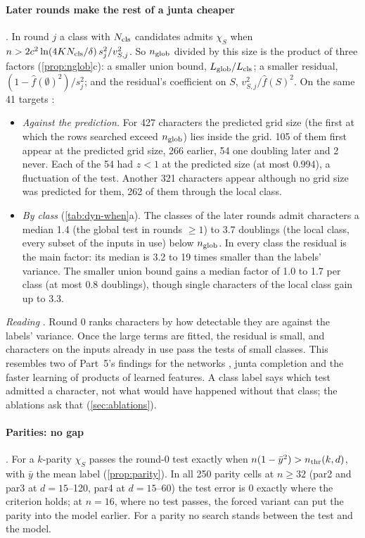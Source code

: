 \paragraph{Later rounds make the rest of a junta cheaper} . In round $j$ a class with $N_{\rm cls}$ candidates admits $\chi_S$ when $n>2c^2\ln(4KN_{\rm cls}/\delta)\,s_j^2/v_{S,j}^2$. So $n_{\rm glob}$ divided by this size is the product of three factors (\cref{prop:nglob}c): a smaller union bound, $L_{\rm glob}/L_{\rm cls}$; a smaller residual, $(1-\hat f(\emptyset)^2)/s_j^2$; and the residual's coefficient on $S$, $v_{S,j}^2/\hat f(S)^2$. On the same 41 targets :
\begin{itemize}
\item \emph{Against the prediction.} For 427 characters the predicted grid size (the first at which the rows searched exceed $n_{\rm glob}$) lies inside the grid. 105 of them first appear at the predicted grid size, 266 earlier, 54 one doubling later and 2 never. Each of the 54 had $z<1$ at the predicted size (at most 0.994), a fluctuation of the test. Another 321 characters appear although no grid size was predicted for them, 262 of them through the local class.
\item \emph{By class} (\cref{tab:dyn-when}a). The classes of the later rounds admit characters a median 1.4 (the global test in rounds $\ge1$) to 3.7 doublings (the local class, every subset of the inputs in use) below $n_{\rm glob}$. In every class the residual is the main factor: its median is 3.2 to 19 times smaller than the labels' variance. The smaller union bound gains a median factor of 1.0 to 1.7 per class (at most 0.8 doublings), though single characters of the local class gain up to 3.3.
\end{itemize}
\emph{Reading} . Round 0 ranks characters by how detectable they are against the labels' variance. Once the large terms are fitted, the residual is small, and characters on the inputs already in use pass the tests of small classes. This resembles two of Part~5's findings for the networks \cite{gdcircuit2026}, junta completion and the faster learning of products of learned features. A class label says which test admitted a character, not what would have happened without that class; the ablations ask that (\cref{sec:ablations}).

\paragraph{Parities: no gap} . For a $k$-parity $\chi_S$ passes the round-0 test exactly when $n(1-\bar y^2)>n_{\rm thr}(k,d)$, with $\bar y$ the mean label (\cref{prop:parity}). In all 250 parity cells at $n\ge32$ (par2 and par3 at $d=15$--120, par4 at $d=15$--60) the test error is 0 exactly where the criterion holds; at $n=16$, where no test passes, the forced variant can put the parity into the model earlier. For a parity no search stands between the test and the model.

